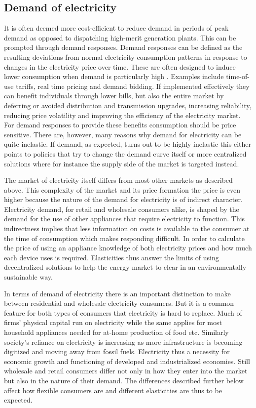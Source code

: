 \subsection{Demand of electricity}
\label{subsec:t_demand}
It is often deemed more cost-efficient to reduce demand in periods of peak demand as opposed to dispatching high-merit generation plants. This can be prompted through demand responses. Demand responses can be defined as the resulting deviations from normal electricity consumption patterns in response to changes in the electricity price over time. These are often designed to induce lower consumption when demand is particularly high \citep{albadi2008summary}. Examples include time-of-use tariffs, real time pricing and demand bidding. If implemented effectively they can benefit individuals through lower bills, but also the entire market by deferring or avoided distribution and transmission upgrades, increasing reliability, reducing price volatility and improving the efficiency of the electricity market. For demand responses to provide these benefits consumption should be price sensitive. There are, however, many reasons why demand for electricity can be quite inelastic. If demand, as expected, turns out to be highly inelastic this either points to policies that try to change the demand curve itself or more centralized solutions where for instance the supply side of the market is targeted instead.
\medskip

The market of electricity itself differs from most other markets as described above. This complexity of the market and its price formation the price is even higher because the nature of the demand for electricity is of indirect character. Electricity demand, for retail and wholesale consumers alike, is shaped by the demand for the use of other appliances that require electricity to function.
This indirectness implies that less information on costs is available to the consumer at the time of consumption which makes responding difficult. In order to calculate the price of using an appliance knowledge of both electricity prices and how much each device uses is required. Elasticities thus answer the limits of using decentralized solutions to help the energy market to clear in an environmentally sustainable way. 
\medskip

In terms of demand of electricity there is an important distinction to make between residential and wholesale electricity consumers. But it is a common feature for both types of consumers that electricity is hard to replace. Much of firms' physical capital run on electricity while the same applies for most household appliances needed for at-home production of food etc. Similarly society's reliance on electricity is increasing as more infrastructure is becoming digitized and moving away from fossil fuels. Electricity thus a necessity for economic growth and functioning of developed and industrialized economies. Still wholesale and retail consumers differ not only in how they enter into the market but also in the nature of their demand. The differences described further below affect how flexible consumers are and different elasticities are thus to be expected.

